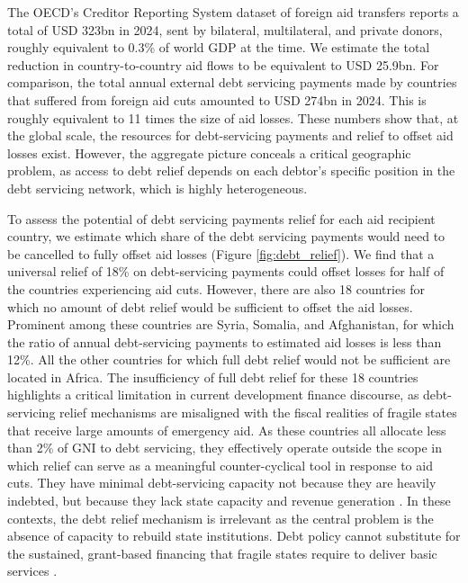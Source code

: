 \documentclass[fleqn,10pt,twocolumn]{wlscirep}
\begin{document}
{
The OECD's Creditor Reporting System dataset of foreign aid transfers reports a total of USD 323bn in 2024, sent by bilateral, multilateral, and private donors, roughly equivalent to 0.3\% of world GDP at the time. We estimate the total reduction in country-to-country aid flows to be equivalent to USD 25.9bn. For comparison, the total annual external debt servicing payments made by countries that suffered from foreign aid cuts amounted to USD 274bn in 2024. This is roughly equivalent to 11 times the size of aid losses. These numbers show that, at the global scale, the resources for debt-servicing payments and relief to offset aid losses exist. However, the aggregate picture conceals a critical geographic problem, as access to debt relief depends on each debtor's specific position in the debt servicing network, which is highly heterogeneous.

To assess the potential of debt servicing payments relief for each aid recipient country, we estimate which share of the debt servicing payments would need to be cancelled to fully offset aid losses (Figure \ref{fig:debt_relief}). We find that a universal relief of 18\% on debt-servicing payments could offset losses for half of the countries experiencing aid cuts. However, there are also 18 countries for which no amount of debt relief would be sufficient to offset the aid losses. Prominent among these countries are Syria, Somalia, and Afghanistan, for which the ratio of annual debt-servicing payments to estimated aid losses is less than 12\%. All the other countries for which full debt relief would not be sufficient are located in Africa. The insufficiency of full debt relief for these 18 countries highlights a critical limitation in current development finance discourse, as debt-servicing relief mechanisms are misaligned with the fiscal realities of fragile states that receive large amounts of emergency aid. As these countries all allocate less than 2\% of GNI to debt servicing, they effectively operate outside the scope in which relief can serve as a meaningful counter-cyclical tool in response to aid cuts. They have minimal debt-servicing capacity not because they are heavily indebted, but because they lack state capacity and revenue generation \cite{riddell2008does}. In these contexts, the debt relief mechanism is irrelevant as the central problem is the absence of capacity to rebuild state institutions. Debt policy cannot substitute for the sustained, grant-based financing that fragile states require to deliver basic services \cite{killick2003imf}.

}
\end{document}
